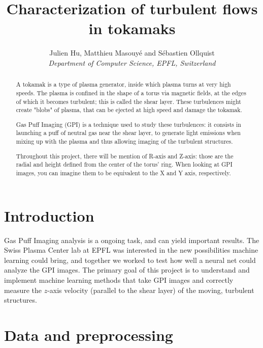 \documentclass[10pt,conference]{IEEEtran}
\begin{document}
\title{Characterization of turbulent flows in tokamaks}

\author{
  Julien Hu, Matthieu Masouyé and Sébastien Ollquist\\
  \textit{Department of Computer Science, EPFL, Switzerland}
}

\maketitle

\begin{abstract}
  A tokamak is a type of plasma generator, inside which plasma turns at very high speeds. The plasma is confined in the shape of a torus via magnetic fields, at the edges of which it becomes turbulent; this is called the shear layer. These turbulences might create "blobs" of plasma, that can be ejected at high speed and damage the tokamak.\par
  
  Gas Puff Imaging (GPI) is a technique used to study these turbulences: it consists in launching a puff of neutral gas near the shear layer, to generate light emissions when mixing up with the plasma and thus allowing imaging of the turbulent structures.\par

  Throughout this project, there will be mention of R-axis and Z-axis: those are the radial and height defined from the center of the torus' ring. When looking at GPI images, you can imagine them to be equivalent to the X and Y axis, respectively.
\end{abstract}

\section{Introduction}
Gas Puff Imaging analysis is a ongoing task, and can yield important results. The Swiss Plasma Center lab at EPFL was interested in the new possibilities machine learning could bring, and together we worked to test how well a neural net could analyze the GPI images.
The primary goal of this project is to understand and implement machine learning methods that take GPI images and correctly measure the $z$-axis velocity (parallel to the shear layer) of the moving, turbulent structures.
\section{Data and preprocessing}
\end{document}
